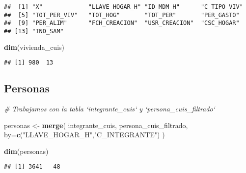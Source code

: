 \documentclass[11pt,]{article}
\newenvironment{Shaded}{\begin{snugshade}}{\end{snugshade}}
\newcommand{\KeywordTok}[1]{\textcolor[rgb]{0.13,0.29,0.53}{\textbf{#1}}}
\newcommand{\DataTypeTok}[1]{\textcolor[rgb]{0.13,0.29,0.53}{#1}}
\newcommand{\DecValTok}[1]{\textcolor[rgb]{0.00,0.00,0.81}{#1}}
\newcommand{\StringTok}[1]{\textcolor[rgb]{0.31,0.60,0.02}{#1}}
\newcommand{\CommentTok}[1]{\textcolor[rgb]{0.56,0.35,0.01}{\textit{#1}}}
\newcommand{\OperatorTok}[1]{\textcolor[rgb]{0.81,0.36,0.00}{\textbf{#1}}}
\newcommand{\NormalTok}[1]{#1}
\begin{document}
\begin{verbatim}
##  [1] "X"             "LLAVE_HOGAR_H" "ID_MDM_H"      "C_TIPO_VIV"   
##  [5] "TOT_PER_VIV"   "TOT_HOG"       "TOT_PER"       "PER_GASTO"    
##  [9] "PER_ALIM"      "FCH_CREACION"  "USR_CREACION"  "CSC_HOGAR"    
## [13] "IND_SAM"
\end{verbatim}

\begin{Shaded}
\begin{Highlighting}[]
\KeywordTok{dim}\NormalTok{(vivienda_cuis)}
\end{Highlighting}
\end{Shaded}

\begin{verbatim}
## [1] 980  13
\end{verbatim}

\subsection{Personas}\label{personas}

\begin{Shaded}
\begin{Highlighting}[]
\CommentTok{# Trabajamos con la tabla `integrante_cuis` y `persona_cuis_filtrado`}

\NormalTok{personas <-}\StringTok{ }\KeywordTok{merge}\NormalTok{( integrante_cuis, }
\NormalTok{                   persona_cuis_filtrado,}
                   \DataTypeTok{by=}\KeywordTok{c}\NormalTok{(}\StringTok{"LLAVE_HOGAR_H"}\NormalTok{,}\StringTok{"C_INTEGRANTE"}\NormalTok{) )}

\KeywordTok{dim}\NormalTok{(personas)}
\end{Highlighting}
\end{Shaded}

\begin{verbatim}
## [1] 3641   48
\end{verbatim}

\begin{Shaded}
\end{Shaded}
\end{document}
